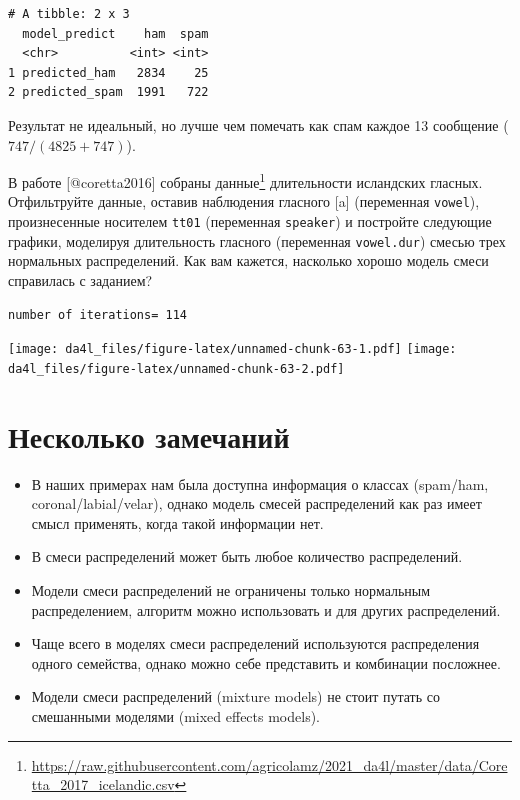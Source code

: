\documentclass[
]{book}
\makeatletter
\providecommand{\tightlist}{%
  \setlength{\itemsep}{0pt}\setlength{\parskip}{0pt}}
\renewcommand{\href}[2]{#2\footnote{\url{#1}}}
\newenvironment{kframe}{%
    \medskip{}
    \setlength{\fboxsep}{.8em}
    \def\at@end@of@kframe{}%
    \ifinner\ifhmode%
    \def\at@end@of@kframe{\end{minipage}}%
    \begin{minipage}{\columnwidth}%
    \fi\fi%
    \def\FrameCommand##1{\hskip\@totalleftmargin \hskip-\fboxsep
    \colorbox{shadecolor}{##1}\hskip-\fboxsep
        \hskip-\linewidth \hskip-\@totalleftmargin \hskip\columnwidth}%
    \MakeFramed {\advance\hsize-\width
      \@totalleftmargin\z@ \linewidth\hsize
      \@setminipage}}%
  {\par\unskip\endMakeFramed%
    \at@end@of@kframe}
\newenvironment{rmdblock}[1]
  {
    \begin{itemize}
    \renewcommand{\labelitemi}{
      \raisebox{-.7\height}[0pt][0pt]{
        {\setkeys{Gin}{width=3em,keepaspectratio}\texttt{[image: images/\#1]}}
        }
        }
        \setlength{\fboxsep}{1em}
        \begin{kframe}
        \item
      }
      {
        \end{kframe}
        \end{itemize}
      }
\newenvironment{rmdtask}
      {\begin{rmdblock}{task}}
      {\end{rmdblock}}
\makeatother
\begin{document}
\begin{verbatim}
# A tibble: 2 x 3
  model_predict    ham  spam
  <chr>          <int> <int>
1 predicted_ham   2834    25
2 predicted_spam  1991   722
\end{verbatim}

Результат не идеальный, но лучше чем помечать как спам каждое 13 сообщение (\(747/(4825+747)\)).

\begin{rmdtask}
В работе {[}@coretta2016{]} собраны
\href{https://raw.githubusercontent.com/agricolamz/2021_da4l/master/data/Coretta_2017_icelandic.csv}{данные}
длительности исландских гласных. Отфильтруйте данные, оставив наблюдения
гласного {[}a{]} (переменная \texttt{vowel}), произнесенные носителем
\texttt{tt01} (переменная \texttt{speaker}) и постройте следующие
графики, моделируя длительность гласного (переменная \texttt{vowel.dur})
смесью трех нормальных распределений. Как вам кажется, насколько хорошо
модель смеси справилась с заданием?
\end{rmdtask}

\begin{verbatim}
number of iterations= 114 
\end{verbatim}

\texttt{[image: da4l\_files/figure-latex/unnamed-chunk-63-1.pdf]} \texttt{[image: da4l\_files/figure-latex/unnamed-chunk-63-2.pdf]}

\hypertarget{ux43dux435ux441ux43aux43eux43bux44cux43aux43e-ux437ux430ux43cux435ux447ux430ux43dux438ux439}{%
\section{Несколько замечаний}\label{ux43dux435ux441ux43aux43eux43bux44cux43aux43e-ux437ux430ux43cux435ux447ux430ux43dux438ux439}}

\begin{itemize}
\tightlist
\item
  В наших примерах нам была доступна информация о классах (spam/ham, coronal/labial/velar), однако модель смесей распределений как раз имеет смысл применять, когда такой информации нет.
\item
  В смеси распределений может быть любое количество распределений.
\item
  Модели смеси распределений не ограничены только нормальным распределением, алгоритм можно использовать и для других распределений.
\item
  Чаще всего в моделях смеси распределений используются распределения одного семейства, однако можно себе представить и комбинации посложнее.
\item
  Модели смеси распределений (mixture models) не стоит путать со смешанными моделями (mixed effects models).
\end{itemize}
\end{document}
